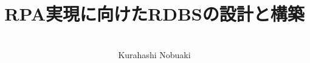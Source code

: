 
\titlehead{\hfill\small\customdate}

\subject{\Large--- プログラム作成業務の自動化 ---}

\title{\huge RPA実現に向けたRDBSの設計と構築}


\date{}

\publishers{}

\author{\ \\\small Kurahashi Nobuaki}

\uppertitleback{\small
This document was created using \TeX{} (\linkLaTeX\kern.15em2$_{\textstyle\varepsilon}$), specifically utilizing tools such as \linkTeXLive{} 2023, up\LaTeX, \linkBibLaTeX\ (\linkBiber), \linkPGFTikZ, and many useful packages, and \linkTeXStudio.\\
Numerical calculations were performed using \linkExcel{} and \linkPython.\\
The source codes for the G-code programs were written using \linkVSCode.\\
Version control for these documents was managed using \linkGitHub.\\
Thanks to these tools, with the all-around support of  (\linkMicrosoftCopilot), the creation of this document and system was made possible.
}

